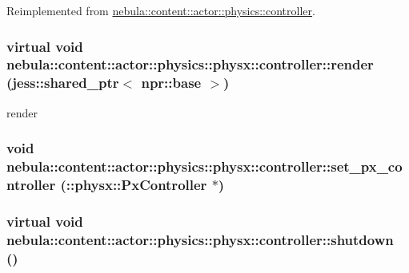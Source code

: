 Reimplemented from \hyperlink{classnebula_1_1content_1_1actor_1_1physics_1_1controller_a8ef51f82c285732fd3c5919c1019caa8}{nebula::content::actor::physics::controller}.\hypertarget{classnebula_1_1content_1_1actor_1_1physics_1_1physx_1_1controller_ac47242115c662651bcaa0fbd3c2e87e9}{
\subsubsection[{render}]{\setlength{\rightskip}{0pt plus 5cm}virtual void nebula::content::actor::physics::physx::controller::render (jess::shared\_\-ptr$<$ {\bf npr::base} $>$)}}
\label{classnebula_1_1content_1_1actor_1_1physics_1_1physx_1_1controller_ac47242115c662651bcaa0fbd3c2e87e9}


render \hypertarget{classnebula_1_1content_1_1actor_1_1physics_1_1physx_1_1controller_a47f42d3e89f26708f5f0b01aa317e5bd}{
\subsubsection[{set\_\-px\_\-controller}]{\setlength{\rightskip}{0pt plus 5cm}void nebula::content::actor::physics::physx::controller::set\_\-px\_\-controller (::physx::PxController $\ast$)}}
\label{classnebula_1_1content_1_1actor_1_1physics_1_1physx_1_1controller_a47f42d3e89f26708f5f0b01aa317e5bd}
\hypertarget{classnebula_1_1content_1_1actor_1_1physics_1_1physx_1_1controller_ad362140ea40ff733f562c37fb7550d14}{
\subsubsection[{shutdown}]{\setlength{\rightskip}{0pt plus 5cm}virtual void nebula::content::actor::physics::physx::controller::shutdown ()}}
\label{classnebula_1_1content_1_1actor_1_1physics_1_1physx_1_1controller_ad362140ea40ff733f562c37fb7550d14}


